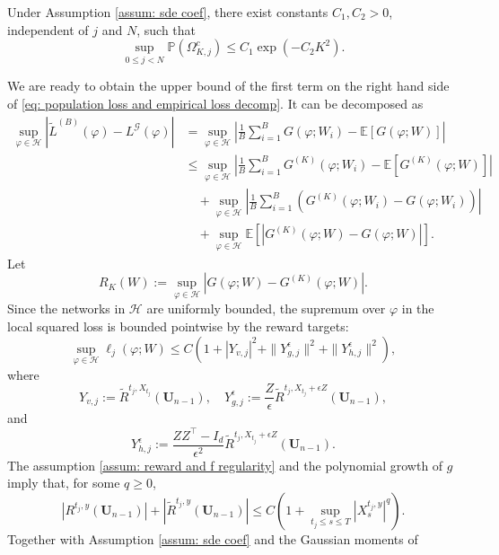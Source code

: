 \documentclass[twoside,11pt]{article}
\newcommand{\E}{\mathbb{E}}
\newcommand{\cH}{\mathcal{H}}
\newcommand{\1}{\mathbf{1}}
\numberwithin{equation}{section}
\begin{document}
\begin{lemma}\label{lemma: tail probability}
    Under Assumption \ref{assum: sde coef}, there exist constants
    $C_1,C_2>0$, independent of $j$ and $N$, such that
    \begin{equation}
        \sup_{0\le j<N}\mathbb P(\Omega_{K,j}^c)
        \le
        C_1\exp(-C_2K^2).
    \end{equation}
\end{lemma}
We are ready to obtain the upper bound of the first term on the right hand side of \eqref{eq: population loss and empirical loss decomp}. It can be decomposed as
\begin{equation}\label{eq: empiricial loss decomp}
    \begin{aligned}
        \sup_{\varphi \in \cH}\left| \tilde L^{(B)}(\varphi) - L^{\mathscr{G}}(\varphi)\right| &= \sup_{\varphi\in\cH} \left| \frac{1}{B}\sum_{i=1}^B G(\varphi;W_i) - \E[G(\varphi;W)]\right| \\
        &\le \sup_{\varphi \in \cH} \left| \frac{1}{B}\sum_{i=1}^B G^{(K)}(\varphi;W_i) - \E[G^{(K)}(\varphi;W)] \right|\\
        &\quad+ \sup_{\varphi \in \cH}\left| \frac{1}{B} \sum_{i=1}^B \left( G^{(K)}(\varphi;W_i) - G(\varphi;W_i)\right)\right|\\
        &\quad+ \sup_{\varphi \in \cH}\E\left[ \left| G^{(K)}(\varphi;W) - G(\varphi;W)\right|\right].
    \end{aligned}
\end{equation}
Let
\[
    R_K(W)
    :=
    \sup_{\varphi\in\mathcal H}
    |G(\varphi;W)-G^{(K)}(\varphi;W)|.
\]
Since the networks in $\mathcal H$ are uniformly bounded, the supremum over
$\varphi$ in the local squared loss is bounded pointwise by the reward targets:
\[
    \sup_{\varphi\in\mathcal H}\ell_j(\varphi;W)
    \le
    C\left(
    1+|Y_{v,j}|^2+\|Y_{g,j}^{\epsilon}\|^2+\|Y_{h,j}^{\epsilon}\|^2
    \right),
\]
where
\[
    Y_{v,j}:=\tilde R^{t_j,X_{t_j}}(\mathbf U_{n-1}),\quad
    Y_{g,j}^{\epsilon}:=\frac{Z}{\epsilon}
    \tilde R^{t_j,X_{t_j}+\epsilon Z}(\mathbf U_{n-1}),
\]
and
\[
    Y_{h,j}^{\epsilon}:=
    \frac{ZZ^\top-I_d}{\epsilon^2}
    \tilde R^{t_j,X_{t_j}+\epsilon Z}(\mathbf U_{n-1}).
\]
The assumption \ref{assum: reward and f regularity} and the polynomial
growth of $g$ imply that, for some $q\ge0$,
\[
    |R^{t_j,y}(\mathbf U_{n-1})|
    +
    |\tilde R^{t_j,y}(\mathbf U_{n-1})|
    \le
    C\left(1+
    \sup_{t_j\le s\le T}|X_s^{t_j,y}|^q\right).
\]
Together with Assumption \ref{assum: sde coef} and the Gaussian moments of
\end{document}
